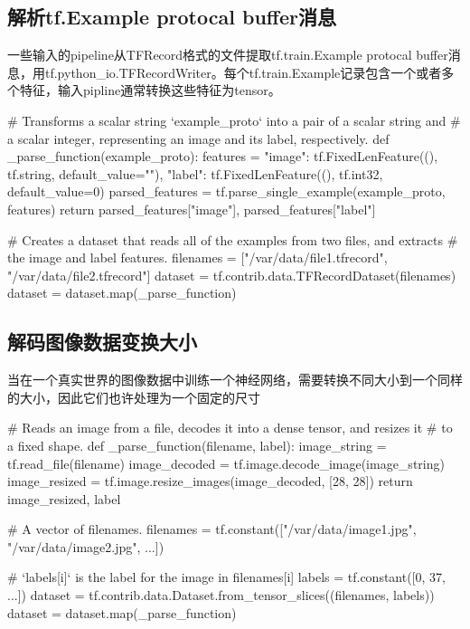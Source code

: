 \subsection{解析tf.Example protocal buffer消息}
一些输入的pipeline从TFRecord格式的文件提取tf.train.Example protocal buffer消息，用tf.python\_io.TFRecordWriter。每个tf.train.Example记录包含一个或者多个特征，输入pipline通常转换这些特征为tensor。
\begin{python}
# Transforms a scalar string `example\_proto` into a pair of a scalar string and
# a scalar integer, representing an image and its label, respectively.
def _parse_function(example_proto):
    features = {"image": tf.FixedLenFeature((), tf.string, default_value=""),
                "label": tf.FixedLenFeature((), tf.int32, default_value=0)}
    parsed_features = tf.parse_single_example(example_proto, features)
    return parsed_features["image"], parsed_features["label"]

# Creates a dataset that reads all of the examples from two files, and extracts
# the image and label features.
filenames = ["/var/data/file1.tfrecord", "/var/data/file2.tfrecord"]
dataset = tf.contrib.data.TFRecordDataset(filenames)
dataset = dataset.map(_parse_function)
\end{python}
\subsection{解码图像数据变换大小}
当在一个真实世界的图像数据中训练一个神经网络，需要转换不同大小到一个同样的大小，因此它们也许处理为一个固定的尺寸
\begin{python}
# Reads an image from a file, decodes it into a dense tensor, and resizes it
# to a fixed shape.
def _parse_function(filename, label):
    image_string = tf.read_file(filename)
    image_decoded = tf.image.decode_image(image_string)
    image_resized = tf.image.resize_images(image_decoded, [28, 28])
    return image_resized, label

# A vector of filenames.
filenames = tf.constant(["/var/data/image1.jpg", "/var/data/image2.jpg", ...])

# `labels[i]` is the label for the image in filenames[i]
labels = tf.constant([0, 37, ...])
dataset = tf.contrib.data.Dataset.from_tensor_slices((filenames, labels))
dataset = dataset.map(_parse_function)
\end{python}
